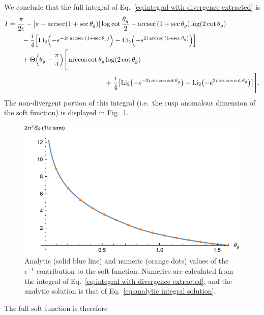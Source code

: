 \documentclass[11pt,twoside,reqno]{amsart}
\theoremstyle{plain}
\theoremstyle{remark}
\theoremstyle{definition}
\theoremstyle{remark}
\theoremstyle{definition}
\theoremstyle{definition}
\newcommand{\Li}{\mathrm{Li}}
\begin{document}
	We conclude that the full integral of Eq.~\ref{eq:integral with divergence extracted} is
	\begin{equation}\label{eq:analytic integral solution}
	\begin{aligned}
		I &= \frac{\pi}{2\epsilon} - \qty[\pi - \arcsec(1 + \sec\theta_g)]\log\cot\frac{\theta_g}{2} - \arcsec\qty(1 + \sec\theta_g) \log(2\cot\theta_g) \\
			&\qquad - \frac{i}{4}\qty[\Li_2\qty(-e^{-2i\arcsec\qty(1 + \sec\theta_g)}) - \Li_2\qty(-e^{2i\arcsec\qty(1 + \sec\theta_g)})] \\
			&\qquad+ \Theta\qty(\theta_g - \frac{\pi}{4})\Bigg[ \arccos\cot\theta_g \log(2\cot\theta_g) \\
			&\hspace{5cm}+ \frac{i}{4}\qty[\Li_2\qty(-e^{-2i\arccos\cot\theta_g}) - \Li_2\qty(-e^{2i\arccos\cot\theta_g})] \Bigg].
	\end{aligned}
	\end{equation}
	The non-divergent portion of this integral (i.e.\ the cusp anomalous dimension of the soft function) is displayed in Fig.~\ref{fig:non-divergent integral}.
	\begin{figure}
		\includegraphics[width=0.75\columnwidth]{figures/full_non_divergent.pdf}
		\caption{\label{fig:non-divergent integral} Analytic (solid blue line) and numeric (orange dots) values of the $\epsilon^{-1}$ contribution to the soft function. Numerics are calculated from the integral of Eq.~\ref{eq:integral with divergence extracted}, and the analytic solution is that of Eq.~\ref{eq:analytic integral solution}.}
	\end{figure}
	The full soft function is therefore
\end{document}
